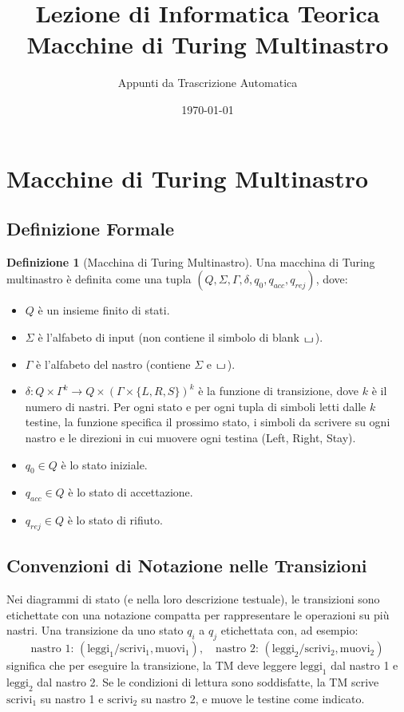 \documentclass[a4paper]{article}
\title{Lezione di Informatica Teorica\\{\Large Macchine di Turing Multinastro}}
\author{Appunti da Trascrizione Automatica}
\date{\today}
\theoremstyle{definition} %
\newtheorem{definition}{Definizione}
\newcommand{\blankS}{\ensuremath{\raisebox{-0.15ex}{\scalebox{1.3}[0.7]{$\sqcup$}}\mkern2mu}}
\begin{document}
\maketitle
\tableofcontents
\newpage

\section{Macchine di Turing Multinastro}

\subsection{Definizione Formale}

\begin{definition}[Macchina di Turing Multinastro]
Una macchina di Turing multinastro è definita come una tupla $(Q, \Sigma, \Gamma, \delta, q_0, q_{acc}, q_{rej})$, dove:
\begin{itemize}
    \item $Q$ è un insieme finito di stati.
    \item $\Sigma$ è l'alfabeto di input (non contiene il simbolo di blank $\blankS$).
    \item $\Gamma$ è l'alfabeto del nastro (contiene $\Sigma$ e $\blankS$).
    \item $\delta: Q \times \Gamma^k \to Q \times (\Gamma \times \{L, R, S\})^k$ è la funzione di transizione, dove $k$ è il numero di nastri. Per ogni stato e per ogni tupla di simboli letti dalle $k$ testine, la funzione specifica il prossimo stato, i simboli da scrivere su ogni nastro e le direzioni in cui muovere ogni testina (Left, Right, Stay).
    \item $q_0 \in Q$ è lo stato iniziale.
    \item $q_{acc} \in Q$ è lo stato di accettazione.
    \item $q_{rej} \in Q$ è lo stato di rifiuto.
\end{itemize}
\end{definition}

\subsection{Convenzioni di Notazione nelle Transizioni}
Nei diagrammi di stato (e nella loro descrizione testuale), le transizioni sono etichettate con una notazione compatta per rappresentare le operazioni su più nastri. Una transizione da uno stato $q_i$ a $q_j$ etichettata con, ad esempio:
\[ \text{nastro 1: } (\text{leggi}_1/\text{scrivi}_1, \text{muovi}_1), \quad \text{nastro 2: } (\text{leggi}_2/\text{scrivi}_2, \text{muovi}_2) \]
significa che per eseguire la transizione, la TM deve leggere $\text{leggi}_1$ dal nastro 1 e $\text{leggi}_2$ dal nastro 2. Se le condizioni di lettura sono soddisfatte, la TM scrive $\text{scrivi}_1$ su nastro 1 e $\text{scrivi}_2$ su nastro 2, e muove le testine come indicato.
\end{document}
